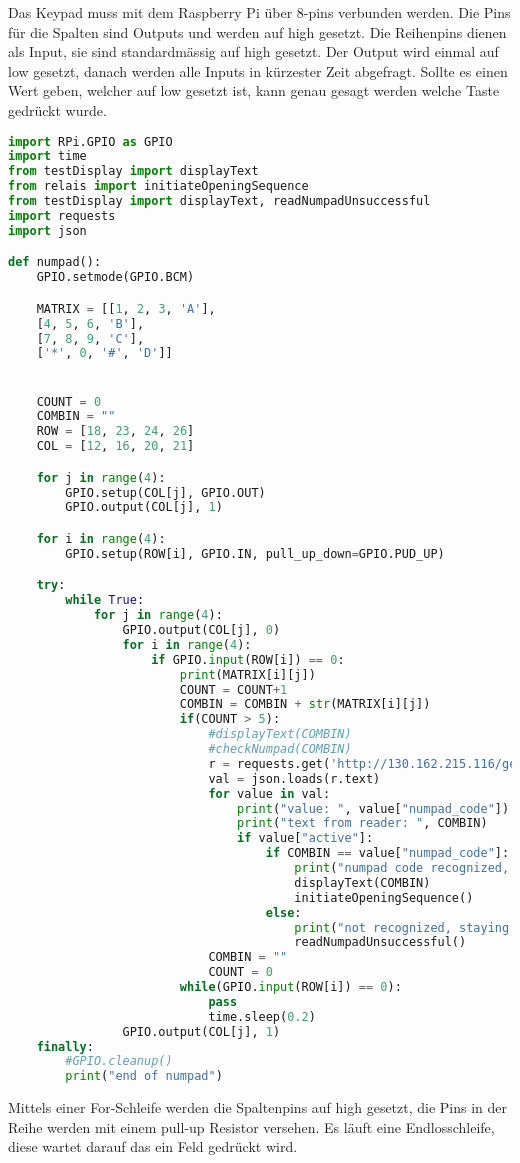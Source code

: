 Das Keypad muss mit dem Raspberry Pi über 8-pins verbunden werden. Die Pins für die Spalten sind Outputs und werden auf high gesetzt. Die Reihenpins dienen als Input, sie sind standardmässig auf high gesetzt. Der Output wird einmal auf low gesetzt, danach werden alle Inputs in kürzester Zeit abgefragt. Sollte es einen Wert geben, welcher auf low gesetzt ist, kann genau gesagt werden welche Taste gedrückt wurde. 
\begin{lstlisting}[language=python, caption=Numpad.py]
    import RPi.GPIO as GPIO
import time
from testDisplay import displayText
from relais import initiateOpeningSequence
from testDisplay import displayText, readNumpadUnsuccessful
import requests
import json

def numpad():
    GPIO.setmode(GPIO.BCM)

    MATRIX = [[1, 2, 3, 'A'],
    [4, 5, 6, 'B'],
    [7, 8, 9, 'C'],
    ['*', 0, '#', 'D']]


    COUNT = 0
    COMBIN = ""
    ROW = [18, 23, 24, 26]
    COL = [12, 16, 20, 21]

    for j in range(4):
        GPIO.setup(COL[j], GPIO.OUT)
        GPIO.output(COL[j], 1)

    for i in range(4):
        GPIO.setup(ROW[i], GPIO.IN, pull_up_down=GPIO.PUD_UP)

    try:
        while True:
            for j in range(4):
                GPIO.output(COL[j], 0)
                for i in range(4):
                    if GPIO.input(ROW[i]) == 0:
                        print(MATRIX[i][j])
                        COUNT = COUNT+1
                        COMBIN = COMBIN + str(MATRIX[i][j])
                        if(COUNT > 5):
                            #displayText(COMBIN)
                            #checkNumpad(COMBIN)
                            r = requests.get('http://130.162.215.116/get-numpad-codes')
                            val = json.loads(r.text)
                            for value in val:
                                print("value: ", value["numpad_code"])
                                print("text from reader: ", COMBIN)
                                if value["active"]:
                                    if COMBIN == value["numpad_code"]:
                                        print("numpad code recognized, initiating opening sequence")
                                        displayText(COMBIN)
                                        initiateOpeningSequence()
                                    else:
                                        print("not recognized, staying closed")
                                        readNumpadUnsuccessful()
                            COMBIN = ""
                            COUNT = 0
                        while(GPIO.input(ROW[i]) == 0):
                            pass
                            time.sleep(0.2)
                GPIO.output(COL[j], 1)
    finally:
        #GPIO.cleanup()
        print("end of numpad")

\end{lstlisting}

Mittels einer For-Schleife werden die Spaltenpins auf high gesetzt, die Pins in der Reihe werden mit einem pull-up Resistor versehen. Es läuft eine Endlosschleife, diese wartet darauf das ein Feld gedrückt wird.